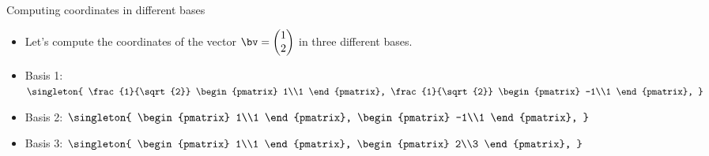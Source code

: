 \documentclass{beamer}
\begin{document}
\begin{frame}{Computing coordinates in different bases}
\begin{itemize}
\item Let's compute the coordinates of the vector $\bv=\begin{pmatrix} 1\\2 \end{pmatrix}$ in three different bases.
\item Basis 1: $\singleton{
\frac{1}{\sqrt{2}}
\begin{pmatrix} 1\\1 \end{pmatrix},
\frac{1}{\sqrt{2}}
\begin{pmatrix} -1\\1 \end{pmatrix},
}$
\item Basis 2: $\singleton{
\begin{pmatrix} 1\\1 \end{pmatrix},
\begin{pmatrix} -1\\1 \end{pmatrix},
}$
\item Basis 3: $\singleton{
\begin{pmatrix} 1\\1 \end{pmatrix},
\begin{pmatrix} 2\\3 \end{pmatrix},
}$
\end{itemize}
\end{frame}
\end{document}
